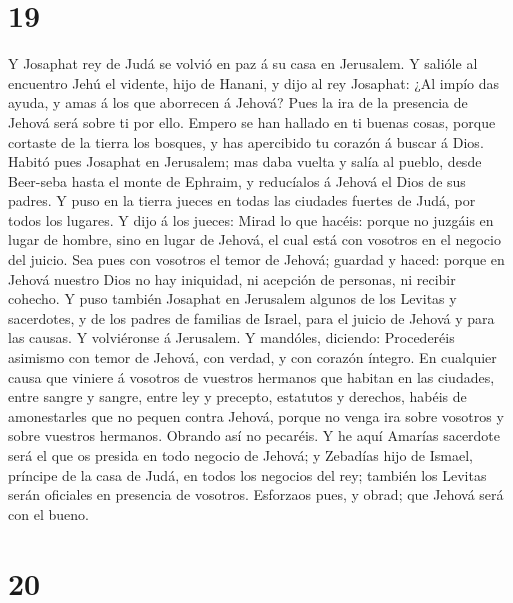 \hypertarget{section-18}{%
\section{19}\label{section-18}}

 Y Josaphat rey de Judá se volvió en paz á su casa en
Jerusalem.  Y salióle al encuentro Jehú el vidente, hijo
de Hanani, y dijo al rey Josaphat: ¿Al impío das ayuda, y amas á los que
aborrecen á Jehová? Pues la ira de la presencia de Jehová será sobre ti
por ello.  Empero se han hallado en ti buenas cosas,
porque cortaste de la tierra los bosques, y has apercibido tu corazón á
buscar á Dios.  Habitó pues Josaphat en Jerusalem; mas
daba vuelta y salía al pueblo, desde Beer-seba hasta el monte de
Ephraim, y reducíalos á Jehová el Dios de sus padres.  Y
puso en la tierra jueces en todas las ciudades fuertes de Judá, por
todos los lugares.  Y dijo á los jueces: Mirad lo que
hacéis: porque no juzgáis en lugar de hombre, sino en lugar de Jehová,
el cual está con vosotros en el negocio del juicio.  Sea
pues con vosotros el temor de Jehová; guardad y haced: porque en Jehová
nuestro Dios no hay iniquidad, ni acepción de personas, ni recibir
cohecho.  Y puso también Josaphat en Jerusalem algunos de
los Levitas y sacerdotes, y de los padres de familias de Israel, para el
juicio de Jehová y para las causas. Y volviéronse á Jerusalem.
 Y mandóles, diciendo: Procederéis asimismo con temor de
Jehová, con verdad, y con corazón íntegro.  En cualquier
causa que viniere á vosotros de vuestros hermanos que habitan en las
ciudades, entre sangre y sangre, entre ley y precepto, estatutos y
derechos, habéis de amonestarles que no pequen contra Jehová, porque no
venga ira sobre vosotros y sobre vuestros hermanos. Obrando así no
pecaréis.  Y he aquí Amarías sacerdote será el que os
presida en todo negocio de Jehová; y Zebadías hijo de Ismael, príncipe
de la casa de Judá, en todos los negocios del rey; también los Levitas
serán oficiales en presencia de vosotros. Esforzaos pues, y obrad; que
Jehová será con el bueno.

\hypertarget{section-19}{%
\section{20}\label{section-19}}

